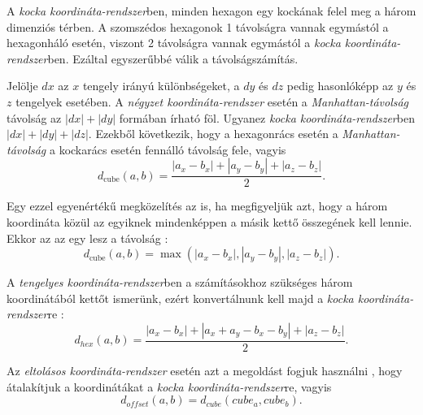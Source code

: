 
A \textit{kocka koordináta-rendszer}ben, minden hexagon egy kockának felel meg a három dimenziós térben. A szomszédos hexagonok 1 távolságra vannak egymástól a hexagonháló esetén, viszont 2 távolságra vannak egymástól a \textit{kocka koordináta-rendszer}ben. Ezáltal egyszerűbbé válik a távolságszámítás.

Jelölje $dx$ az $x$ tengely irányú különbségeket, a $dy$ és $dz$ pedig hasonlóképp az $y$ és $z$ tengelyek esetében. A \textit{négyzet koordináta-rendszer} esetén a \textit{Manhattan-távolság} távolság az $|dx| + |dy|$ formában írható föl. Ugyanez \textit{kocka koordináta-rendszer}ben $|dx| + |dy| + |dz|$. Ezekből következik, hogy a hexagonrács esetén a \textit{Manhattan-távolság} a kockarács esetén fennálló távolság fele, vagyis
$$
d_{\text{cube}}(a, b) =
\dfrac{|a_x - b_x| + |a_y - b_y| + |a_z - b_z|}{2}.
$$

Egy ezzel egyenértékű megközelítés az is, ha megfigyeljük azt, hogy a három koordináta közül az egyiknek mindenképpen a másik kettő összegének kell lennie. Ekkor az az egy lesz a távolság \cite{Distance_Cube}:
$$
d_{\text{cube}}(a, b) =
\max(
|a_x - b_x|, |a_y - b_y|, |a_z - b_z|
).
$$


A \textit{tengelyes koordináta-rendszer}ben a számításokhoz szükséges három koordinátából kettőt ismerünk, ezért konvertálnunk kell majd a \textit{kocka koordináta-rendszer}re \cite{Distance_Axial}:
$$
d_{hex}(a, b) = \frac{|a_x - b_x| + |a_x + a_y - b_x - b_y| + |a_z - b_z|}{2}.
$$


Az \textit{eltolásos koordináta-rendszer} esetén azt a megoldást fogjuk használni \cite{Distance_Offset}, hogy átalakítjuk a koordinátákat a \textit{kocka koordináta-rendszer}re, vagyis
$$
d_{of\!fset} (a, b) = d_{cube}(cube_a, cube_b).
$$

